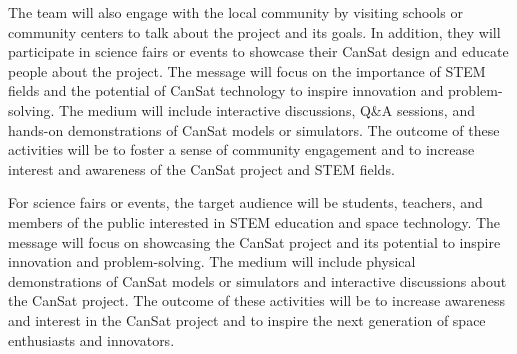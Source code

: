 \documentclass[11pt]{article}
\begin{document}
The team will also engage with the local community by visiting schools or community centers to talk about the project and its goals. In addition, they will participate in science fairs or events to showcase their CanSat design and educate people about the project. The message will focus on the importance of STEM fields and the potential of CanSat technology to inspire innovation and problem-solving. The medium will include interactive discussions, Q\&A sessions, and hands-on demonstrations of CanSat models or simulators. The outcome of these activities will be to foster a sense of community engagement and to increase interest and awareness of the CanSat project and STEM fields.

For science fairs or events, the target audience will be students, teachers, and members of the public interested in STEM education and space technology. The message will focus on showcasing the CanSat project and its potential to inspire innovation and problem-solving. The medium will include physical demonstrations of CanSat models or simulators and interactive discussions about the CanSat project. The outcome of these activities will be to increase awareness and interest in the CanSat project and to inspire the next generation of space enthusiasts and innovators.
\end{document}
